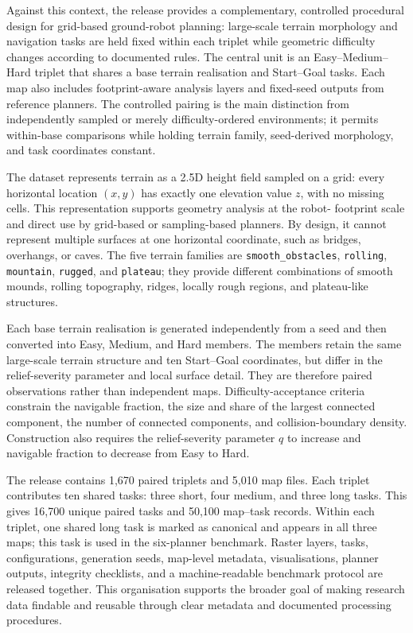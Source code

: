 \documentclass[11pt]{article}
\begin{document}
Against this context, the release provides a complementary, controlled
procedural design for grid-based ground-robot planning: large-scale terrain
morphology and navigation tasks are held fixed within each triplet while
geometric difficulty changes according to documented rules. The central unit
is an Easy--Medium--Hard triplet that shares a base terrain realisation and
Start--Goal tasks. Each map also includes footprint-aware analysis layers and
fixed-seed outputs from reference planners. The controlled pairing is the main
distinction from independently sampled or merely difficulty-ordered
environments; it permits within-base comparisons while holding terrain family,
seed-derived morphology, and task coordinates constant.

The dataset represents terrain as a 2.5D height field sampled on a grid: every
horizontal location $(x,y)$ has exactly one elevation value $z$, with no
missing cells. This representation supports geometry analysis at the robot-
footprint scale and direct use by grid-based or sampling-based planners. By
design, it cannot represent multiple surfaces at one horizontal coordinate,
such as bridges, overhangs, or caves. The five terrain families are
\texttt{smooth\_obstacles}, \texttt{rolling}, \texttt{mountain},
\texttt{rugged}, and \texttt{plateau}; they provide different combinations of
smooth mounds, rolling topography, ridges, locally rough regions, and
plateau-like structures.

Each base terrain realisation is generated independently from a seed and then
converted into Easy, Medium, and Hard members. The members retain the same
large-scale terrain structure and ten Start--Goal coordinates, but differ in
the relief-severity parameter and local surface detail. They are therefore paired observations rather
than independent maps. Difficulty-acceptance criteria constrain the navigable
fraction, the size and share of the largest connected component, the number of
connected components, and collision-boundary density. Construction also
requires the relief-severity parameter $q$ to increase and navigable fraction
to decrease from Easy to Hard.

The release contains 1,670 paired triplets and 5,010 map files. Each triplet
contributes ten shared tasks: three short, four medium, and three long tasks.
This gives 16,700 unique paired tasks and 50,100 map--task records. Within each
triplet, one shared long task is marked as canonical and appears in all three
maps; this task is used in the six-planner benchmark. Raster layers, tasks,
configurations, generation seeds, map-level metadata, visualisations, planner
outputs, integrity checklists, and a machine-readable benchmark protocol are
released together. This organisation
supports the broader goal of making research data findable and reusable through
clear metadata and documented processing procedures\cite{fair}.
\end{document}

